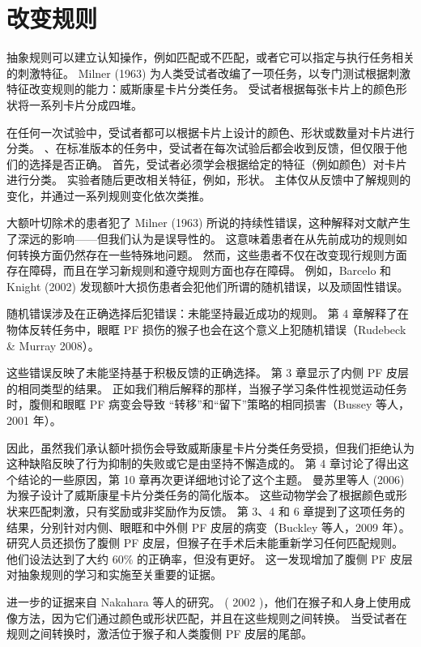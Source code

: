 \section{改变规则}
\par
抽象规则可以建立认知操作，例如匹配或不匹配，或者它可以指定与执行任务相关的刺激特征。 
Milner (1963) 为人类受试者改编了一项任务，以专门测试根据刺激特征改变规则的能力：威斯康星卡片分类任务。 
受试者根据每张卡片上的颜色形状将一系列卡片分成四堆。
\par
在任何一次试验中，受试者都可以根据卡片上设计的颜色、形状或数量对卡片进行分类。 
、在标准版本的任务中，受试者在每次试验后都会收到反馈，但仅限于他们的选择是否正确。 
首先，受试者必须学会根据给定的特征（例如颜色）对卡片进行分类。 
实验者随后更改相关特征，例如，形状。 
主体仅从反馈中了解规则的变化，并通过一系列规则变化依次类推。
\par
大额叶切除术的患者犯了 Milner (1963) 所说的持续性错误，这种解释对文献产生了深远的影响——但我们认为是误导性的。 
这意味着患者在从先前成功的规则如何转换方面仍然存在一些特殊地问题。 
然而，这些患者不仅在改变现行规则方面存在障碍，而且在学习新规则和遵守规则方面也存在障碍。 
例如，Barcelo 和 Knight (2002) 发现额叶大损伤患者会犯他们所谓的随机错误，以及顽固性错误。
\par
随机错误涉及在正确选择后犯错误：未能坚持最近成功的规则。 
第 4 章解释了在物体反转任务中，眼眶 PF 损伤的猴子也会在这个意义上犯随机错误（Rudebeck \& Murray 2008）。
\par
这些错误反映了未能坚持基于积极反馈的正确选择。 第 3 章显示了内侧 PF 皮层的相同类型的结果。 
正如我们稍后解释的那样，当猴子学习条件性视觉运动任务时，腹侧和眼眶 PF 病变会导致
“转移”和“留下”策略的相同损害（Bussey 等人，2001 年）。
\par
因此，虽然我们承认额叶损伤会导致威斯康星卡片分类任务受损，但我们拒绝认为这种缺陷反映了行为抑制的失败或它是由坚持不懈造成的。 
第 4 章讨论了得出这个结论的一些原因，第 10 章再次更详细地讨论了这个主题。 
曼苏里等人 (2006) 为猴子设计了威斯康星卡片分类任务的简化版本。 
这些动物学会了根据颜色或形状来匹配刺激，只有奖励或非奖励作为反馈。 
第 3、4 和 6 章提到了这项任务的结果，分别针对内侧、眼眶和中外侧 PF 皮层的病变（Buckley 等人，2009 年）。 
研究人员还损伤了腹侧 PF 皮层，但猴子在手术后未能重新学习任何匹配规则。 
他们设法达到了大约 60\% 的正确率，但没有更好。 
这一发现增加了腹侧 PF 皮层对抽象规则的学习和实施至关重要的证据。
\par
进一步的证据来自 Nakahara 等人的研究。 ( 2002 )，他们在猴子和人身上使用成像方法，因为它们通过颜色或形状匹配，并且在这些规则之间转换。 
当受试者在规则之间转换时，激活位于猴子和人类腹侧 PF 皮层的尾部。 
